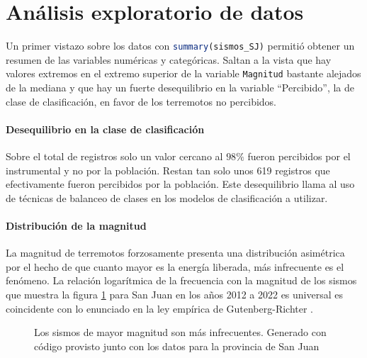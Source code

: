 \documentclass[a4paper]{report}
\begin{document}





\section{Análisis exploratorio de datos}\label{sec:AED}

Un primer vistazo sobre los datos con \lstinline[language = R]'summary(sismos_SJ)' permitió obtener un resumen de las variables numéricas y categóricas.
Saltan a la vista que hay valores extremos en el extremo superior de la variable \lstinline[language = R]'Magnitud' bastante alejados de la mediana y que hay un fuerte desequilibrio en la variable ``Percibido'', la de clase de clasificación, en favor de los terremotos no percibidos.


\paragraph{Desequilibrio en la clase de clasificación}
Sobre el total de registros solo un valor cercano al \(98\%\) fueron percibidos por el instrumental y no por la población.
Restan tan solo unos \num{619} registros que efectivamente fueron percibidos por la población.
Este desequilibrio llama al uso de técnicas de balanceo de clases en los modelos de clasificación a utilizar.


\paragraph{Distribución de la magnitud}
La magnitud de terremotos forzosamente presenta una distribución asimétrica por el hecho de que cuanto mayor es la energía liberada, más infrecuente es el fenómeno.
La relación logarítmica de la frecuencia con la magnitud de los sismos que muestra la figura \ref{fig:acumulado_anual_magnitud} para San Juan en los años 2012 a 2022 es universal es coincidente con lo enunciado en la ley empírica de Gutenberg-Richter \cite[ec. 4.24]{fowler_solid_1990}.

\begin{figure}[!ht]
\centering

\vspace{-0.8cm}
\caption{Los sismos de mayor magnitud son más infrecuentes. Generado con código provisto junto con los datos para la provincia de San Juan \cite[sección 4.2.1]{daniela_parada_ic-datasets-docencia_nodate}}
\label{fig:acumulado_anual_magnitud}
\end{figure}
\end{document}
